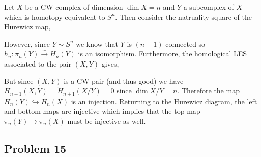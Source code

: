 \documentclass[12pt]{extarticle}
\begin{document}
Let $X$ be a CW complex of dimension $\dim{X} = n$ and $Y$ a subcomplex of $X$ which is homotopy equivalent to $S^n$. Then consider the natruality square of the Hurewicz map,
\begin{center}
\end{center}
However, since $Y \sim S^n$ we know that $Y$ is $(n-1)$-connected so $h_n : \pi_n(Y) \xrightarrow{\sim} H_n(Y)$ is an isomorphism. Furthermore, the homological LES associated to the pair $(X, Y)$ gives,
\begin{center}
\end{center} 
But since $(X, Y)$ is a CW pair (and thus good) we have $H_{n+1}(X, Y) = \tilde{H}_{n+1}(X / Y) = 0$ since $\dim{X / Y} = n$. Therefore the map $H_{n}(Y) \hookrightarrow H_n(X)$ is an injection. Returning to the Hurewicz diagram, the left and bottom maps are injective which implies that the top map $\pi_n(Y) \to \pi_n(X)$ must be injective as well. 

\subsection{Problem 15}
\end{document}
